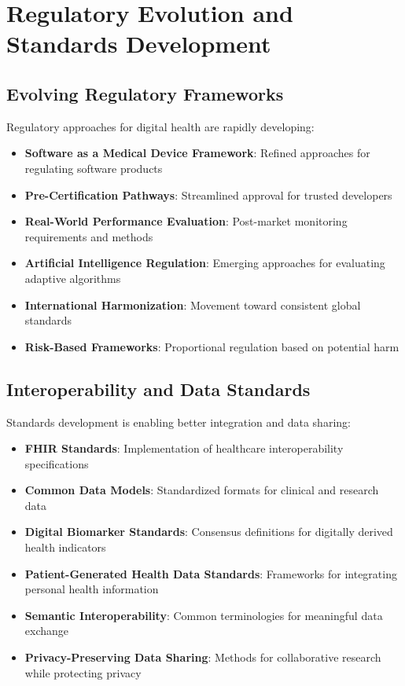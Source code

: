 \section{Regulatory Evolution and Standards Development}
\subsection{Evolving Regulatory Frameworks}
Regulatory approaches for digital health are rapidly developing:

\begin{itemize}
    \item \textbf{Software as a Medical Device Framework}: Refined approaches for regulating software products
    
    \item \textbf{Pre-Certification Pathways}: Streamlined approval for trusted developers
    
    \item \textbf{Real-World Performance Evaluation}: Post-market monitoring requirements and methods
    
    \item \textbf{Artificial Intelligence Regulation}: Emerging approaches for evaluating adaptive algorithms
    
    \item \textbf{International Harmonization}: Movement toward consistent global standards
    
    \item \textbf{Risk-Based Frameworks}: Proportional regulation based on potential harm
\end{itemize}

\subsection{Interoperability and Data Standards}
Standards development is enabling better integration and data sharing:

\begin{itemize}
    \item \textbf{FHIR Standards}: Implementation of healthcare interoperability specifications
    
    \item \textbf{Common Data Models}: Standardized formats for clinical and research data
    
    \item \textbf{Digital Biomarker Standards}: Consensus definitions for digitally derived health indicators
    
    \item \textbf{Patient-Generated Health Data Standards}: Frameworks for integrating personal health information
    
    \item \textbf{Semantic Interoperability}: Common terminologies for meaningful data exchange
    
    \item \textbf{Privacy-Preserving Data Sharing}: Methods for collaborative research while protecting privacy
\end{itemize}

